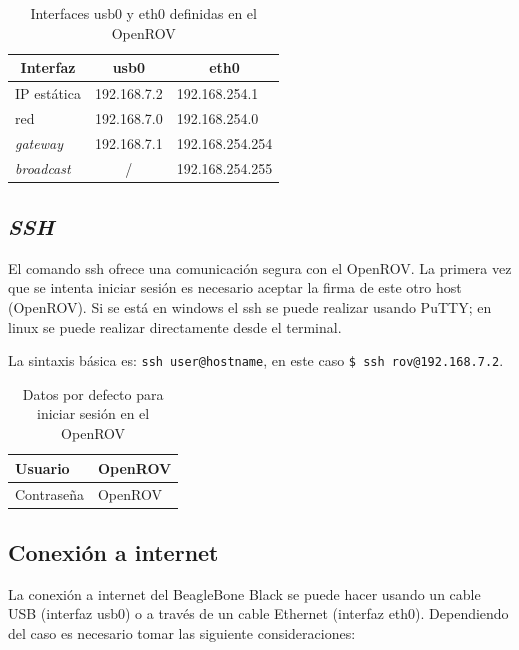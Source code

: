 \begin{table} [H]
\caption {Interfaces usb0 y eth0 definidas en el OpenROV} 
\label{tab:usb0eth0}
\centering
\begin{tabular}{@{}lll@{}}
\toprule
\multicolumn{1}{c}{\textbf{Interfaz}} & \multicolumn{1}{c}{\textbf{usb0}} & \multicolumn{1}{c}{\textbf{eth0}} \\ \midrule
IP estática         & 192.168.7.2       & 192.168.254.1           \\
red                 & 192.168.7.0       & 192.168.254.0            \\
\textit{gateway}    & 192.168.7.1       & 192.168.254.254           \\ 
\textit{broadcast}  & \multicolumn{1}{c}{/} & 192.168.254.255        \\ \bottomrule
\end{tabular}
\end{table}

\subsection{\textit{SSH}}
El comando ssh ofrece una comunicación segura con el OpenROV. La primera vez que se intenta iniciar sesión es necesario aceptar la firma de este otro host (OpenROV). Si se está en windows el ssh se puede realizar usando PuTTY; en linux se puede realizar directamente desde el terminal.

La sintaxis básica es: \verb|ssh user@hostname|, en este caso \verb|$ ssh rov@192.168.7.2|.

\begin{table} [H]
\caption {Datos por defecto para iniciar sesión en el OpenROV} 
\label{tab:UserPass}
\centering
\begin{tabular}{@{}ll@{}}
\toprule
Usuario    & OpenROV \\ \midrule
Contraseña & OpenROV \\ \bottomrule
\end{tabular}
\end{table}

\subsection{Conexión a internet}

La conexión a internet del BeagleBone Black se puede hacer usando un cable USB (interfaz usb0) o a través de un cable Ethernet (interfaz eth0). Dependiendo del caso es necesario tomar las siguiente consideraciones: 

